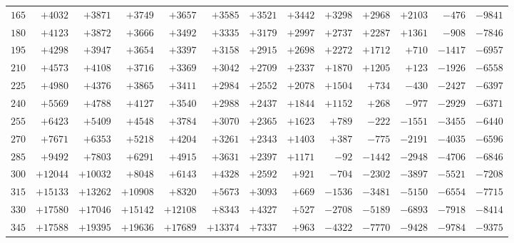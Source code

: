 \begin{landscape}
\begin{center}
\begin{tabular}{@{}r|*{11}{r|}r@{}}
\(165\) & \(+4032\) & \(+3871\) & \(+3749\) & \(+3657\) & \(+3585\) & \(+3521\) & \(+3442\) & \(+3298\) & \(+2968\) & \(+2103\) & \(-476\) & \(-9841\)\\
\(180\) & \(+4123\) & \(+3872\) & \(+3666\) & \(+3492\) & \(+3335\) & \(+3179\) & \(+2997\) & \(+2737\) & \(+2287\) & \(+1361\) & \(-908\) & \(-7846\)\\
\(195\) & \(+4298\) & \(+3947\) & \(+3654\) & \(+3397\) & \(+3158\) & \(+2915\) & \(+2698\) & \(+2272\) & \(+1712\) & \(+710\) & \(-1417\) & \(-6957\)\\
\(210\) & \(+4573\) & \(+4108\) & \(+3716\) & \(+3369\) & \(+3042\) & \(+2709\) & \(+2337\) & \(+1870\) & \(+1205\) & \(+123\) & \(-1926\) & \(-6558\)\\
\(225\) & \(+4980\) & \(+4376\) & \(+3865\) & \(+3411\) & \(+2984\) & \(+2552\) & \(+2078\) & \(+1504\) & \(+734\) & \(-430\) & \(-2427\) & \(-6397\)\\
\(240\) & \(+5569\) & \(+4788\) & \(+4127\) & \(+3540\) & \(+2988\) & \(+2437\) & \(+1844\) & \(+1152\) & \(+268\) & \(-977\) & \(-2929\) & \(-6371\)\\
\(255\) & \(+6423\) & \(+5409\) & \(+4548\) & \(+3784\) & \(+3070\) & \(+2365\) & \(+1623\) & \(+789\) & \(-222\) & \(-1551\) & \(-3455\) & \(-6440\)\\
\(270\) & \(+7671\) & \(+6353\) & \(+5218\) & \(+4204\) & \(+3261\) & \(+2343\) & \(+1403\) & \(+387\) & \(-775\) & \(-2191\) & \(-4035\) & \(-6596\)\\
\(285\) & \(+9492\) & \(+7803\) & \(+6291\) & \(+4915\) & \(+3631\) & \(+2397\) & \(+1171\) & \(-92\) & \(-1442\) & \(-2948\) & \(-4706\) & \(-6846\)\\
\(300\) & \(+12044\) & \(+10032\) & \(+8048\) & \(+6143\) & \(+4328\) & \(+2592\) & \(+921\) & \(-704\) & \(-2302\) & \(-3897\) & \(-5521\) & \(-7208\)\\
\(315\) & \(+15133\) & \(+13262\) & \(+10908\) & \(+8320\) & \(+5673\) & \(+3093\) & \(+669\) & \(-1536\) & \(-3481\) & \(-5150\) & \(-6554\) & \(-7715\)\\
\(330\) & \(+17580\) & \(+17046\) & \(+15142\) & \(+12108\) & \(+8343\) & \(+4327\) & \(+527\) & \(-2708\) & \(-5189\) & \(-6893\) & \(-7918\) & \(-8414\)\\
\(345\) & \(+17588\) & \(+19395\) & \(+19636\) & \(+17689\) & \(+13374\) & \(+7337\) & \(+963\) & \(-4322\) & \(-7770\) & \(-9428\) & \(-9784\) & \(-9375\)\\
\end{tabular}
\end{center}
\endgroup
\end{landscape}

